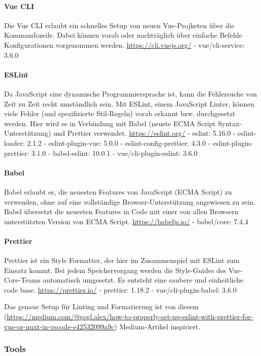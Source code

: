 	\paragraph{Vue CLI}
Die Vue CLI erlaubt ein schnelles Setup von neuen Vue-Projketen über die Kommandozeile. Dabei können vorab oder nachträglich über einfache Befehle Konfigurationen vorgenommen werden. \url{https://cli.vuejs.org/}
- vue/cli-service: 3.6.0

	\paragraph{ESLint}
Da JavaScript eine dynamische Programmiersprache ist, kann die Fehlersuche von Zeit zu Zeit recht umständlich sein.
Mit ESLint, einem JavaScript Linter, können viele Fehler (und spezifizierte Stil-Regeln) vorab erkannt bzw. durchgesetzt werden. Hier wird es in Verbindung mit Babel (neuste ECMA Script Syntax-Unterstützung) und Prettier verwendet. \url{https://eslint.org/}
- eslint: 5.16.0
- eslint-loader: 2.1.2
- eslint-plugin-vue: 5.0.0
- eslint-config-prettier: 4.3.0
- eslint-plugin-prettier: 3.1.0
- babel-eslint: 10.0.1
- vue/cli-plugin-eslint: 3.6.0

	\paragraph{Babel}
Babel erlaubt es, die neuesten Features von JavaScript (ECMA Script) zu verwenden, ohne auf eine vollständige Browser-Unterstützung angewiesen zu sein. Babel übersetzt die neuesten Features in Code mit einer von allen Browsern unterstützten Version von ECMA Script. \url{https://babeljs.io/}
- babel/core: 7.4.4

	\paragraph{Prettier}
Prettier ist ein Style Formatter, der hier im Zusammenspiel mit ESLint zum Einsatz kommt. Bei jedem Speichervorgang werden die Style-Guides des Vue-Core-Teams automatisch umgesetzt. Es entsteht eine saubere und einheitliche code base. \url{https://prettier.io/}
- prettier: 1.18.2
- vue/cli-plugin-babel: 3.6.0

Das genaue Setup für Linting und Formatierung ist von diesem (\url{https://medium.com/@gogl.alex/how-to-properly-set-up-eslint-with-prettier-for-vue-or-nuxt-in-vscode-e42532099a9c}) Medium-Artikel inspiriert.


\subsubsection{Tools}

